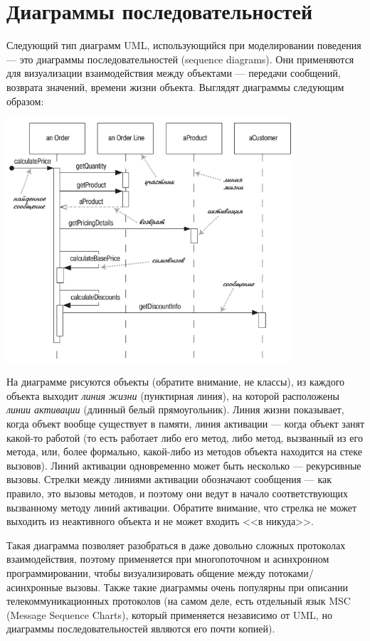 \documentclass{../mcstext}
\begin{document}
\section{Диаграммы последовательностей}

Следующий тип диаграмм UML, использующийся при моделировании поведения --- это диаграммы последовательностей (sequence diagrams). Они применяются для визуализации взаимодействия между объектами --- передачи сообщений, возврата значений, времени жизни объекта. Выглядят диаграммы следующим образом:

\begin{center}
    \includegraphics[width=0.8\textwidth]{sequenceDiagramSyntax.png}
\end{center}

На диаграмме рисуются объекты (обратите внимание, не классы), из каждого объекта выходит \textit{линия жизни} (пунктирная линия), на которой расположены \textit{линии активации} (длинный белый прямоугольник). Линия жизни показывает, когда объект вообще существует в памяти, линия активации --- когда объект занят какой-то работой (то есть работает либо его метод, либо метод, вызванный из его метода, или, более формально, какой-либо из методов объекта находится на стеке вызовов). Линий активации одновременно может быть несколько --- рекурсивные вызовы. Стрелки между линиями активации обозначают сообщения --- как правило, это вызовы методов, и поэтому они ведут в начало соответствующих вызванному методу линий активации. Обратите внимание, что стрелка не может выходить из неактивного объекта и не может входить <<в никуда>>.

Такая диаграмма позволяет разобраться в даже довольно сложных протоколах взаимодействия, поэтому применяется при многопоточном и асинхронном программировании, чтобы визуализировать общение между потоками/асинхронные вызовы. Также такие диаграммы очень популярны при описании телекоммуникационных протоколов (на самом деле, есть отдельный язык MSC (Message Sequence Charts), который применяется независимо от UML, но диаграммы последовательностей являются его почти копией).
\end{document}
